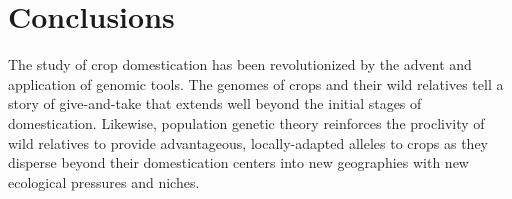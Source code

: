 \documentclass[11pt]{article}
\begin{document}
\section*{Conclusions}

The study of crop domestication has been revolutionized by the advent and application of genomic tools.
The genomes of crops and their wild relatives tell a story of give-and-take that extends well beyond the initial stages of domestication.
Likewise, population genetic theory reinforces the proclivity of wild relatives to provide advantageous, locally-adapted alleles to crops as they disperse beyond their domestication centers into new geographies with new ecological pressures and niches.












\end{document}
